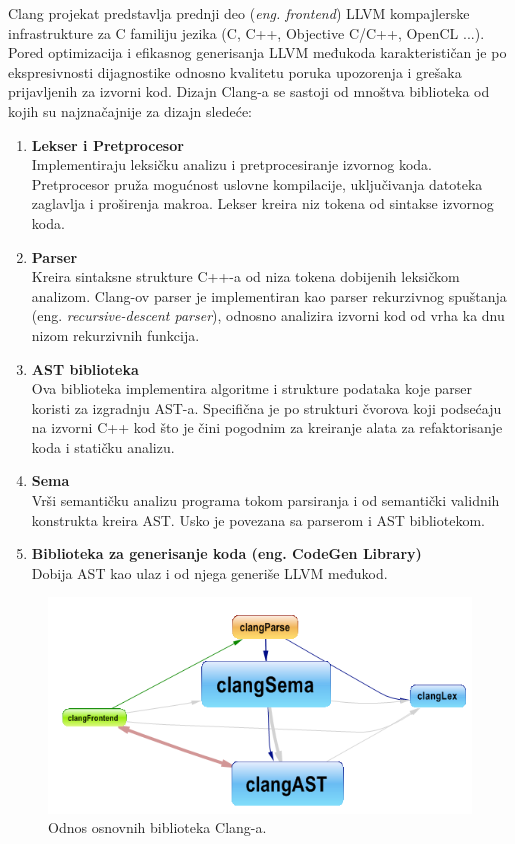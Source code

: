 \documentclass[12pt,oneside]{memoir}
\begin{document}
Clang projekat predstavlja prednji deo (\textit{eng. frontend}) LLVM kompajlerske infrastrukture za C familiju jezika (C, C++, Objective C/C++, OpenCL ...).
Pored optimizacija i efikasnog generisanja LLVM međukoda karakterističan je po ekspresivnosti dijagnostike odnosno kvalitetu poruka upozorenja i grešaka prijavljenih za izvorni kod. Dizajn Clang-a se sastoji od mnoštva biblioteka od kojih su najznačajnije za dizajn sledeće:

\begin{enumerate}
  \item{\textbf{Lekser i Pretprocesor} \\
       Implementiraju leksičku analizu i pretprocesiranje izvornog koda.
       Pretprocesor pru\v{z}a mogućnost uslovne kompilacije, uključivanja datoteka zaglavlja i proširenja makroa.
       Lekser kreira niz tokena od sintakse izvornog koda.}
  \item{\textbf{Parser} \\
        Kreira sintaksne strukture C++-a od niza tokena dobijenih leksičkom analizom.
        Clang-ov parser je implementiran kao parser rekurzivnog spuštanja (eng. \textit{recursive-descent parser}), odnosno analizira izvorni kod od vrha ka dnu nizom rekurzivnih funkcija.}
  \item{\textbf{AST biblioteka} \\
        Ova biblioteka implementira algoritme i strukture podataka koje parser koristi za izgradnju AST-a. Specifična je po strukturi čvorova koji podsećaju na izvorni C++ kod što je čini pogodnim za kreiranje alata za refaktorisanje koda i statičku analizu.}
  \item{\textbf{Sema} \\
        Vrši semantičku analizu programa tokom parsiranja i od semantički validnih konstrukta kreira AST. Usko je povezana sa parserom i AST bibliotekom.}
  \item{\textbf{Biblioteka za generisanje koda (eng. CodeGen Library)} \\
        Dobija AST kao ulaz i od njega generiše LLVM međukod.}

\end{enumerate}

\begin{figure}[!ht]
  \centering
  \includegraphics[width=1\textwidth]{ClangBiblioteke.png}
  \caption{Odnos osnovnih biblioteka Clang-a.}
  \label{fig:grafikon}
\end{figure}
\end{document}
